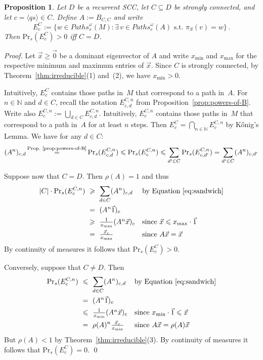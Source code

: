 \documentclass{elsarticle}
\newtheorem{proposition}[definition]{Proposition}
\def\<{\langle}
\def\>{\rangle}
\def\Nat{\mathbb{N}}
\def\Pr{\mathrm{Pr}}
\def\Paths{\mathit{Paths}}
\begin{document}
\begin{proposition}
  Let $D$ be a recurrent SCC, let $C \subseteq D$ be strongly
  connected, and let $c = \< q s \> \in C$.  Define $A:=B_{C,C}$ and
  write
\[ E^C_c := \{ w \in \Paths_s^\omega(M) : \exists\, v \in \Paths_c^\omega(A) \mbox{ s.t. } \pi_S(v)=w \} \, . \]
Then $\Pr_s(E^C_c)>0$ iff $C=D$.
\label{prop:recurrent}
\end{proposition}
\begin{proof}
Let $\vec{x}\geqslant \vec{0}$ be a dominant eigenvector of $A$ and write
$x_{\min}$ and $x_{\max}$ for the
respective minimum and maximum entries of $\vec{x}$.  Since $C$
is strongly connected, by Theorem~\ref{thm:irreducible}(1) and~(2), we have $x_{\min}>0$.

Intuitively, $E^C_c$ contains those paths in~$M$ that correspond to a path in~$A$.
For $n \in \Nat$ and $d \in C$, recall the notation $E^{C,n}_{c,d}$  from Proposition~\ref{prop:powers-of-B}.
Write also $E^{C,n}_{c}:=\bigcup_{d \in C} E^{C,n}_{c,d}$.
Intuitively, $E^{C,n}_{c}$ contains those paths in~$M$ that correspond to a path in~$A$ for at least $n$ steps.
Then $E^C_c = \bigcap_{n\in\mathbb{N}} E^{C,n}_{c}$ by K\H{o}nig's Lemma.
We have for any $d \in C$:
\begin{equation}
\begin{aligned}
(A^n)_{c,d} \mathop{=}^\text{Prop.~\ref{prop:powers-of-B}} \Pr_s(E^{C,n}_{c,d}) \leqslant \Pr_s(E^{C,n}_{c})
\leqslant \sum_{d' \in C} \Pr_s(E^{C,n}_{c,d'}) = \sum_{d' \in C} (A^n)_{c,d'}
\end{aligned}
\label{eq:sandwich}
\end{equation}

  Suppose now that $C=D$. Then $\rho(A)=1$ and thus
\begin{align*}
|C| \cdot \Pr_s(E^{C,n}_{c}) & \ \geqslant \   \sum_{d\in C} (A^n)_{c,d} && \text{by Equation~\eqref{eq:sandwich}}\\
& \ = \ (A^n \vec{1})_c && \\
& \ \geqslant \ \textstyle\frac{1}{x_{\max}} (A^n \vec{x})_c
&& \text{since
$\vec{x} \leqslant x_{\max} \cdot \vec{1}$}\\
& \ = \ \textstyle\frac{\vec{x}_c}{x_{\max}} && \text{since
$A\vec{x}=\vec{x}$}
\end{align*}
By continuity of measures it follows that $\Pr_s(E^C_c)>0$.

Conversely, suppose that $C\neq D$.  Then
\begin{align*}
\Pr_s(E^{C,n}_{c}) & \ \leqslant \ \sum_{d \in C} (A^n)_{c,d}&& \text{by Equation~\eqref{eq:sandwich}}\\
& \ = \ (A^n \vec{1})_c && \\
& \ \leqslant \ \textstyle\frac{1}{x_{\min}} (A^n \vec{x})_c &&
\text{since $x_{\min} \cdot \vec{1} \leqslant \vec{x}$} \\
& \ = \ \rho(A)^n \textstyle \frac{\vec{x}_c}{x_{\min}} &&
\text{since $A\vec{x}=\rho(A)\vec{x}$}\end{align*}
But $\rho(A) < 1$ by Theorem~\ref{thm:irreducible}(3).
By continuity of measures it follows that $\Pr_s(E^C_c)=0$.  \qed
\end{proof}
\end{document}
